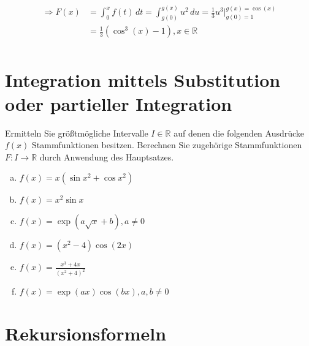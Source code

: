 \documentclass{article}
\begin{document}
\begin{enumerate}[a)]
  \begin{align*}
    \Rightarrow F(x) &= \int_0^x f(t) \,dt = \int_{g(0)}^{g(x)} u^2 \,du = \frac{1}{3} u^3 {\Big |}_{g(0) = 1}^{g(x) = \cos(x)} \\
                     &= \frac{1}{3} (\cos^3 (x) - 1 ), x \in \mathbb{R} \\
  \end{align*}

 \end{enumerate}

\section*{Integration mittels Substitution oder partieller Integration}

Ermitteln Sie größtmögliche Intervalle $I \in \mathbb{R}$ auf denen die
folgenden Ausdrücke $f(x)$ Stammfunktionen besitzen.
Berechnen Sie zugehörige Stammfunktionen $F \colon I \to \mathbb{R}$
durch Anwendung des Hauptsatzes.

\begin{enumerate}[a)]
\item $f(x) = x (\sin x^2 + \cos x^2)$
\item $f(x) = x^2 \sin x$
\item $f(x) = \exp\left( a \sqrt{x} + b \right), a \ne 0$
\item $f(x) = (x^2 -  4) \cos(2x)$
\item $f(x) = \frac{x^3 + 4x}{(x^2 + 4)^2}$
\item $f(x) = \exp(ax) \cos(bx), a, b \ne 0$
\end{enumerate}

\section*{Rekursionsformeln}
\end{document}
